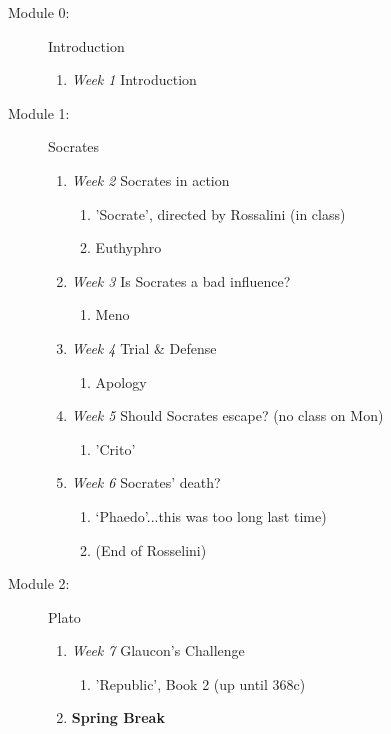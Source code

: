 \documentclass[article,oneside]{memoir}
\begin{document}
\begin{description}
\item[Module 0:] {Introduction}
\begin{enumerate}
\item \textit{Week 1} Introduction 
\end{enumerate}

\item[Module 1:] Socrates
\begin{enumerate}
\item \textit{Week 2} Socrates in action
\begin{enumerate}
\item 'Socrate', directed by Rossalini (in class)
\item Euthyphro
\end{enumerate}

\item \textit{Week 3} Is Socrates a bad influence? 
\begin{enumerate}
\item Meno
\end{enumerate}

\item \textit{Week 4} Trial \& Defense
\begin{enumerate}
\item Apology
\end{enumerate}

\item \textit{Week 5} Should Socrates escape? (no class on Mon)
\begin{enumerate}
\item 'Crito'
\end{enumerate}
\item \textit{Week 6} Socrates' death? 
\begin{enumerate}
\item `Phaedo'...this was too long last time)
\item (End of Rosselini) 
\end{enumerate}
\end{enumerate}


\item[Module 2:] Plato
\begin{enumerate}
\item \textit{Week 7} Glaucon's Challenge
\begin{enumerate}
\item 'Republic', Book 2 (up until 368c) 
\end{enumerate}
\item \textbf{Spring Break}


\end{enumerate}
\end{description}
\end{document}
